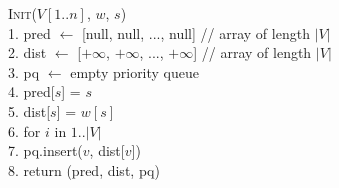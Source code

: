 \documentclass{article}
\begin{document}
\begin{enumerate}[label=(\alph*)]
\begin{enumerate}[label=\alph*)]
\begin{algorithm}
                \textsc{Init}($V[1..n]$, $w$, $s$) \\
                1. \hspace{1em} pred $\gets$ [null, null, ..., null] // array of length $|V|$ \\
                2. \hspace{1em} dist $\gets$ [$+\infty$, $+\infty$, ..., $+\infty$] // array of length $|V|$ \\
                3. \hspace{1em} pq $\gets$ empty priority queue \\
                4. \hspace{1em} pred[$s$] = $s$ \\
                5. \hspace{1em} dist[$s$] = $w[s]$ \\
                6. \hspace{1em} for $i$ in $1..|V|$ \\
                7. \hspace{2em}     pq.insert($v$, dist[$v$]) \\
                8. \hspace{1em} return (pred, dist, pq) \\\\


\end{algorithm}
\end{enumerate}
\end{enumerate}
\end{document}
